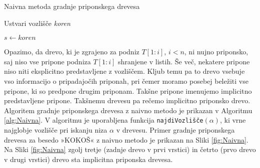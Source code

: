 \begin{algorithm}[htb]

    \caption{Naivna metoda gradnje priponskega drevesa}\label{alg:Naivna}
    {
        {Ustvari vozlišče \textit{koren}}
        
        {$s \leftarrow\textit{koren}$}
        
        
    }
\end{algorithm}

Opazimo, da drevo, ki je zgrajeno za podniz $T[1:i]$, $i< n$, ni nujno priponsko, saj niso vse pripone podniza $T[1:i]$ shranjene v listih. Še več, nekatere pripone niso niti eksplicitno predstavljene z vozliščem. Kljub temu pa to drevo vsebuje vso informacijo o pripadajočih priponah, pri čemer moramo posebej beležiti vse pripone, ki so predpone drugim priponam. Takšne pripone imenujemo implicitno predstavljene pripone. Takšnemu drevesu pa rečemo implicitno priponsko drevo. Algoritem gradnje priponskega drevesa z naivno metodo je prikazan v Algoritmu \ref{alg:Naivna}. V algoritmu je uporabljena funkcija \texttt{najdiVozlišče}$(\alpha)$, ki vrne najglobje vozlišče pri iskanju niza $\alpha$ v drevesu. Primer gradnje priponskega drevesa za besedo »KOKOŠ« z naivno metodo je prikazan na Sliki \ref{fig:Naivna}. Na Sliki \ref{fig:Naivna} zgolj tretje (zadnje drevo v prvi vrstici) in četrto (prvo drevo v drugi vrstici) drevo sta implicitna priponska drevesa.


